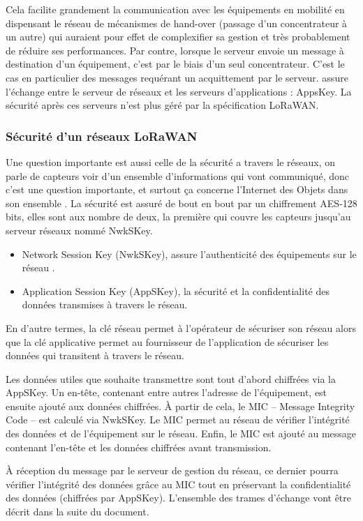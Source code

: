 \documentclass[11pt]{article}
\begin{document}
Cela facilite grandement la communication avec les équipements en mobilité en dispensant le réseau de mécanismes de hand-over (passage d’un concentrateur à un autre) qui auraient pour effet de complexifier sa gestion et très probablement de réduire ses performances. Par contre, lorsque le serveur envoie un message à destination d’un équipement, c’est par le biais d’un seul concentrateur. C’est le cas en particulier des messages requérant un acquittement par le serveur.
 assure l'échange entre le serveur de réseaux et les serveurs d'applications : AppsKey. La sécurité après ces serveurs n'est plus géré par la spécification LoRaWAN.

\newpage
\subsubsection{Sécurité d'un réseaux LoRaWAN}
Une question importante est aussi celle de la sécurité a travers le réseaux, on parle de capteurs voir d'un ensemble d'informations qui vont communiqué, donc c'est une question importante, et surtout ça concerne l'Internet des Objets dans son ensemble .
La sécurité est assuré de bout en bout par un chiffrement AES-128 bits, elles sont aux nombre de deux, la première qui couvre les capteurs jusqu'au serveur réseaux nommé NwkSKey.
\begin{itemize}
\item Network Session Key (NwkSKey), assure l’authenticité des équipements sur le réseau .
\item Application Session Key (AppSKey), la sécurité et la confidentialité des données transmises à travers le réseau.
\end{itemize}

En d’autre termes, la clé réseau permet à l’opérateur de sécuriser son réseau alors que la clé applicative permet au fournisseur de l’application de sécuriser les données qui transitent à travers le réseau.

Les données utiles que souhaite transmettre sont tout d’abord chiffrées via la AppSKey. Un en-tête, contenant entre autres l’adresse de l’équipement, est ensuite ajouté aux données chiffrées. À partir de cela, le MIC – Message Integrity Code – est calculé via NwkSKey. Le MIC permet au réseau de vérifier l’intégrité des données et de l’équipement sur le réseau. Enfin, le MIC est ajouté au message contenant l’en-tête et les données chiffrées avant transmission.

À réception du message par le serveur de gestion du réseau, ce dernier pourra vérifier l’intégrité des données grâce au MIC tout en préservant la confidentialité des données (chiffrées par AppSKey).
L'ensemble des trames d'échange vont être décrit dans la suite du document.
\end{document}
